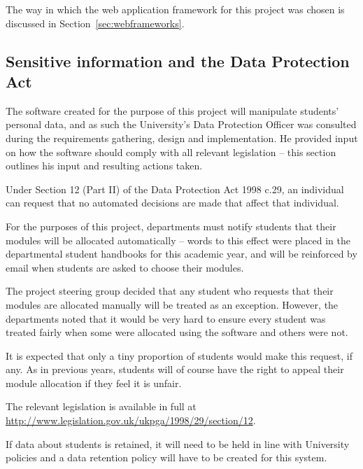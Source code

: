 \documentclass[draft]{scrartcl}
\begin{document}
The way in which the web application framework for this project was chosen is
discussed in Section~\ref{sec:webframeworks}.

\subsection{Sensitive information and the Data Protection Act}
\label{sec:dataprotection}


The software created for the purpose of this project will manipulate students'
personal data, and as such the University's Data Protection Officer was
consulted during the requirements gathering, design and implementation. He
provided input on how the software should comply with all relevant legislation
-- this section outlines his input and resulting actions taken.


Under Section 12 (Part II) of the Data Protection Act 1998 c.29, an individual
can request that no automated decisions are made that affect that individual.

For the purposes of this project, departments must notify students that their
modules will be allocated automatically -- words to this effect were placed in
the departmental student handbooks for this academic year, and will be
reinforced by email when students are asked to choose their modules.

The project steering group decided that any student who requests that their
modules are allocated manually will be treated as an exception. However, the
departments noted that it would be very hard to ensure every student was
treated fairly when some were allocated using the software and others were
not.

It is expected that only a tiny proportion of students would make this
request, if any. As in previous years, students will of course have the right
to appeal their module allocation if they feel it is unfair.

The relevant legislation is available in full at
\url{http://www.legislation.gov.uk/ukpga/1998/29/section/12}.


If data about students is retained, it will need to be held in line with
University policies and a data retention policy will have to be created for
this system.
\end{document}

